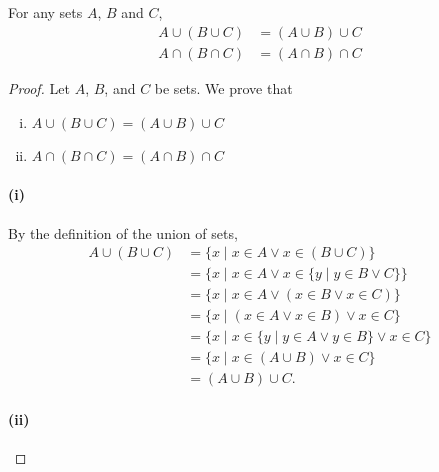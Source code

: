 \documentclass{report}
\begin{document}
\subsection{}%

For any sets $A$, $B$ and $C$,
  \begin{align*}
    A \cup (B \cup C) & = (A \cup B) \cup C \\
    A \cap (B \cap C) & = (A \cap B) \cap C
  \end{align*}

\begin{proof}

  \statementpadding



  \noindent Let $A$, $B$, and $C$ be sets.
  We prove that
    \begin{enumerate}[(i)]
      \item $A \cup (B \cup C) = (A \cup B) \cup C$
      \item $A \cap (B \cap C) = (A \cap B) \cap C$
    \end{enumerate}

  \paragraph{(i)}%

    By the definition of the union of sets,
      \begin{align*}
        A \cup (B \cup C)
          & = \{ x \mid x \in A \lor x \in (B \cup C) \} \\
          & = \{ x \mid x \in A \lor x \in \{ y \mid y \in B \lor C \}\} \\
          & = \{ x \mid x \in A \lor (x \in B \lor x \in C) \} \\
          & = \{ x \mid (x \in A \lor x \in B) \lor x \in C \} \\
          & = \{ x \mid x \in \{ y \mid y \in A \lor y \in B \} \lor
                        x \in C \} \\
          & = \{ x \mid x \in (A \cup B) \lor x \in C \} \\
          & = (A \cup B) \cup C.
      \end{align*}

  \paragraph{(ii)}%


\end{proof}
\end{document}
